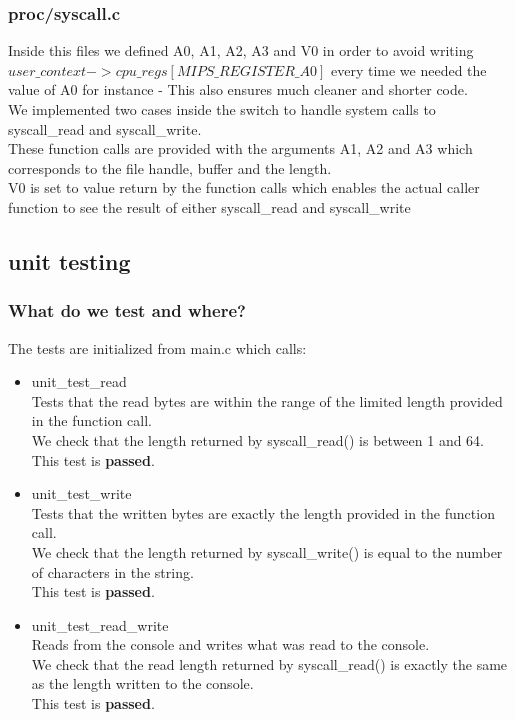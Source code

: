 \documentclass[a4paper,12pt,danish]{report}
\begin{document}
\subsubsection{proc/syscall.c}
Inside this files we defined A0, A1, A2, A3 and V0 in order to avoid writing \textit{$user\_context->cpu\_regs[MIPS\_REGISTER\_A0]$} every time we needed the value of A0 for instance - This also ensures much cleaner and shorter code.
\\
We implemented two cases inside the switch to handle system calls to syscall\_read and syscall\_write.
\\
These function calls are provided with the arguments A1, A2 and A3 which corresponds to the file handle, buffer and the length.\\
V0 is set to value return by the function calls which enables the actual caller function to see the result of either syscall\_read and syscall\_write
\subsection{unit testing}
\subsubsection{What do we test and where?}
The tests are initialized from main.c which calls:
\\
\begin{itemize}
  \item{unit\_test\_read}
    \\
    Tests that the read bytes are within the range of the limited length provided in the function call.
    \\
    We check that the length returned by syscall\_read() is between 1 and 64.
    \\
    This test is \textbf{passed}.
  \item{unit\_test\_write}
    \\
    Tests that the written bytes are exactly the length provided in the function call.
    \\
    We check that the length returned by syscall\_write() is equal to the number of characters in the string.
    \\
    This test is \textbf{passed}.
  \item{unit\_test\_read\_write}
    \\
    Reads from the console and writes what was read to the console.
    \\
    We check that the read length returned by syscall\_read() is exactly the same as the length written to the console.
    \\
    This test is \textbf{passed}.
\end{itemize}
\end{document}
